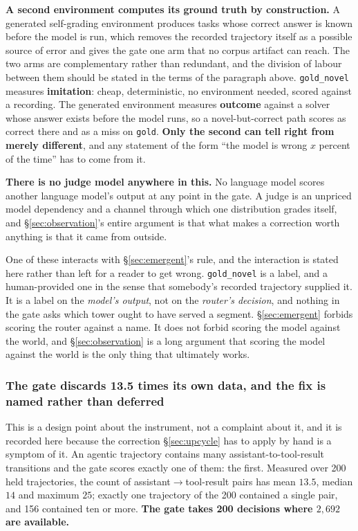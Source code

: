 \documentclass[11pt]{article}
\begin{document}
\textbf{A second environment computes its ground truth by construction.} A generated self-grading environment produces tasks whose correct answer is known before the model is run, which removes the recorded trajectory itself as a possible source of error and gives the gate one arm that no corpus artifact can reach. The two arms are complementary rather than redundant, and the division of labour between them should be stated in the terms of the paragraph above. \texttt{gold\_novel} measures \textbf{imitation}: cheap, deterministic, no environment needed, scored against a recording. The generated environment measures \textbf{outcome} against a solver whose answer exists before the model runs, so a novel-but-correct path scores as correct there and as a miss on \texttt{gold}. \textbf{Only the second can tell right from merely different}, and any statement of the form ``the model is wrong $x$ percent of the time'' has to come from it.

\textbf{There is no judge model anywhere in this.} No language model scores another language model's output at any point in the gate. A judge is an unpriced model dependency and a channel through which one distribution grades itself, and \S\ref{sec:observation}'s entire argument is that what makes a correction worth anything is that it came from outside.

One of these interacts with \S\ref{sec:emergent}'s rule, and the interaction is stated here rather than left for a reader to get wrong. \texttt{gold\_novel} is a label, and a human-provided one in the sense that somebody's recorded trajectory supplied it. It is a label on the \emph{model's output}, not on the \emph{router's decision}, and nothing in the gate asks which tower ought to have served a segment. \S\ref{sec:emergent} forbids scoring the router against a name. It does not forbid scoring the model against the world, and \S\ref{sec:observation} is a long argument that scoring the model against the world is the only thing that ultimately works.

\subsubsection*{The gate discards 13.5 times its own data, and the fix is named rather than deferred}

This is a design point about the instrument, not a complaint about it, and it is recorded here because the correction \S\ref{sec:upcycle} has to apply by hand is a symptom of it. An agentic trajectory contains many assistant-to-tool-result transitions and the gate scores exactly one of them: the first. Measured over 200 held trajectories, the count of assistant$\rightarrow$tool-result pairs has mean $13.5$, median $14$ and maximum $25$; exactly one trajectory of the 200 contained a single pair, and 156 contained ten or more. \textbf{The gate takes 200 decisions where $2{,}692$ are available.}
\end{document}
